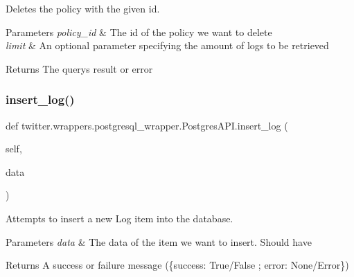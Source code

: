 Deletes the policy with the given id. 


\begin{DoxyParams}{Parameters}
{\em policy\+\_\+id} & The id of the policy we want to delete \\
\hline
{\em limit} & An optional parameter specifying the amount of logs to be retrieved\\
\hline
\end{DoxyParams}
\begin{DoxyReturn}{Returns}
The query\textquotesingle{}s result or error 
\end{DoxyReturn}
\mbox{\label{classtwitter_1_1wrappers_1_1postgresql__wrapper_1_1PostgresAPI_ae0a6d7340ffc3d83829308940a296393}} 
\subsubsection{\texorpdfstring{insert\+\_\+log()}{insert\_log()}}
{\footnotesize\ttfamily def twitter.\+wrappers.\+postgresql\+\_\+wrapper.\+Postgres\+A\+P\+I.\+insert\+\_\+log (\begin{DoxyParamCaption}\item[{}]{self,  }\item[{}]{data }\end{DoxyParamCaption})}



Attempts to insert a new Log item into the database. 


\begin{DoxyParams}{Parameters}
{\em data} & The data of the item we want to insert. Should have \\
\hline
\end{DoxyParams}
\begin{DoxyReturn}{Returns}
A success or failure message (\{success\+: True/\+False ; error\+: None/\+Error\}) 
\end{DoxyReturn}
\mbox{\label{classtwitter_1_1wrappers_1_1postgresql__wrapper_1_1PostgresAPI_a97ea1442f99c7a75f996024dd3e3da8c}} 
